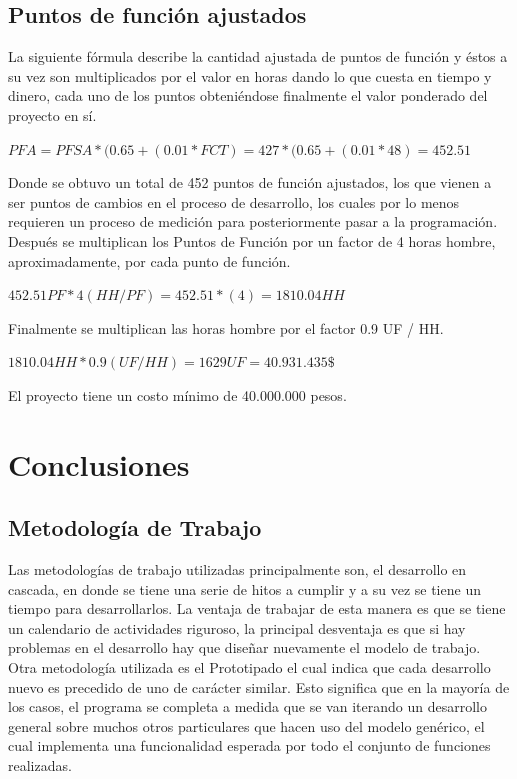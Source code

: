 \documentclass[a4paper,12pt,openany,oneside]{book}
\begin{document}
\section{Puntos de función ajustados}
La siguiente fórmula describe la cantidad ajustada de puntos de función y éstos a su vez son multiplicados por el valor en horas dando lo que cuesta en tiempo y dinero, cada uno de los puntos obteniéndose finalmente el valor ponderado del proyecto en sí.

\begin{math}
PFA=PFSA * ( 0.65 + ( 0.01 * FCT ) = 427 * ( 0.65 + ( 0.01 * 48 ) = 452.51
\end{math}

Donde se obtuvo un total de 452 puntos de función ajustados, los que vienen a ser puntos de cambios en el proceso de desarrollo, los cuales por lo menos requieren un proceso de medición para posteriormente pasar a la programación. Después se multiplican los Puntos de Función por un factor de 4 horas hombre, aproximadamente, por cada punto de función.

\begin{math}
452.51 PF * 4 (HH / PF) = 452.51 * (4) = 1810.04 HH
\end{math}

Finalmente se multiplican las horas hombre por el factor 0.9 UF / HH.

\begin{math}
1810.04 HH * 0.9(UF / HH) = 1629 UF = 40.931.435 \$
\end{math}

El proyecto tiene un costo mínimo de 40.000.000 pesos.

\chapter{Conclusiones}

\section{Metodología de Trabajo}
Las metodologías de trabajo utilizadas principalmente son, el desarrollo en cascada, en donde se tiene una serie de hitos a cumplir y a su vez se tiene un tiempo para desarrollarlos. La ventaja de trabajar de esta manera es que se tiene un calendario de actividades riguroso, la principal desventaja es que si hay problemas en el desarrollo hay que diseñar nuevamente el modelo de trabajo. Otra metodología utilizada es el Prototipado el cual indica que cada desarrollo nuevo es precedido de uno de carácter similar. Esto significa que en la mayoría de los casos, el programa se completa a medida que se van iterando un desarrollo general sobre muchos otros particulares que hacen uso del modelo genérico, el cual implementa una funcionalidad esperada por todo el conjunto de funciones realizadas.
\end{document}
